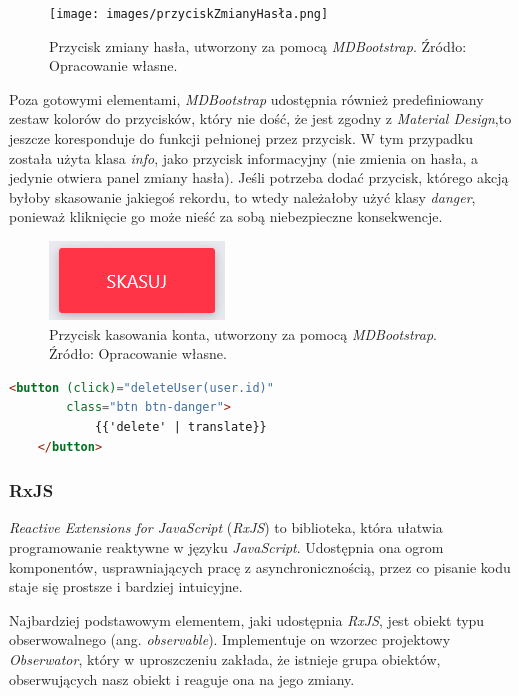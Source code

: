 \documentclass[twoside]{projektInzynierskiMS}
\numberwithin{figure}{section}
\begin{document}
\begin{figure}[h!]
    \centering
    \texttt{[image: images/przyciskZmianyHasła.png]}
    \caption{Przycisk zmiany hasła, utworzony za pomocą \textit{MDBootstrap}. Źródło: Opracowanie własne.}
    \label{fig:przycisk_zmiany_hasła}
\end{figure}

Poza gotowymi elementami, \textit{MDBootstrap} udostępnia również predefiniowany zestaw kolorów do przycisków, który nie dość, że jest zgodny z \textit{Material Design},\linebreak to jeszcze koresponduje do funkcji pełnionej przez przycisk. W tym przypadku została użyta klasa \textit{info}, jako przycisk informacyjny (nie zmienia on hasła, a jedynie otwiera panel zmiany hasła). Jeśli potrzeba dodać przycisk, którego akcją byłoby skasowanie jakiegoś rekordu, to wtedy należałoby użyć klasy \textit{danger}, ponieważ kliknięcie go może nieść za sobą niebezpieczne konsekwencje. 
\newpage

\begin{figure}[h!]
    \centering
    \includegraphics[scale = 0.9]{images/przyciskKasowania.png}
    \caption{Przycisk kasowania konta, utworzony za pomocą \textit{MDBootstrap}. Źródło: Opracowanie własne.}
    \label{fig:przycisk_kasowania_konta}
\end{figure}

\begin{lstlisting}[language=html,caption=Kreowanie przycisku opartego o style MDB. Źródło: Opracowanie własne.,captionpos=b]
    <button (click)="deleteUser(user.id)" 
        class="btn btn-danger">
            {{'delete' | translate}}
    </button>
\end{lstlisting}

\subsubsection{RxJS}
\textit{Reactive Extensions for JavaScript} (\textit{RxJS}) to biblioteka, która ułatwia programowanie reaktywne w języku \textit{JavaScript}. Udostępnia ona ogrom komponentów, usprawniających pracę z asynchronicznością, przez co pisanie kodu staje się prostsze i bardziej intuicyjne. 

Najbardziej podstawowym elementem, jaki udostępnia \textit{RxJS}, jest obiekt typu obserwowalnego (ang. \textit{observable}). Implementuje on wzorzec projektowy \textit{Obserwator}, który w uproszczeniu zakłada, że istnieje grupa obiektów, obserwujących nasz obiekt i reaguje ona na jego zmiany. 
\end{document}
